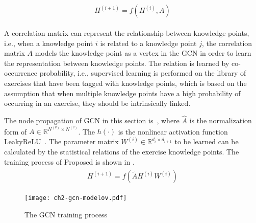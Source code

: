 \begin{align}
    \begin{split}
        H^{(i+1)}=f(H^{(i)},A) \label{fml:ch2-gcnlayer}
    \end{split}
\end{align}


A correlation matrix can represent the relationship between knowledge points, i.e., when a knowledge point \(i\) is related to a knowledge point \(j\), the correlation matrix \(A\) models the knowledge point as a vertex in the GCN in order to learn the representation between knowledge points. The relation is learned by co-occurrence probability, i.e., supervised learning is performed on the library of exercises that have been tagged with knowledge points, which is based on the assumption that when multiple knowledge points have a high probability of occurring in an exercise, they should be intrinsically linked.


The node propagation of GCN in this section is~\eqname{\ref{fml:ch2-gcn2}}, where \(\widehat{A}\) is the normalization form of \(A\in \mathbb{R}^{N^{(v)}\times N^{(v)}}\). The \(h(\cdot)\) is the nonlinear activation function LeakyReLU~\cite{maas2013rectifier}. The parameter matrix \(W^{(i)}\in \mathbb{R}^{d_{i}\times d_{i+1}}\) to be learned can be calculated by the statistical relations of the exercise knowledge points. The training process of Proposed is shown in \figname{\ref{fig:ch2-gcn-explain}}.
\begin{align}
    \begin{split}
        H^{(i+1)} = f(\tilde{A}H^{(i)}W^{(i)})\label{fml:ch2-gcn2}
    \end{split}
\end{align}

\begin{figure}[htbp!]
    \centering
    \texttt{[image: ch2-gcn-modelov.pdf]}
    \caption{The GCN training process}\label{fig:ch2-gcn-explain}
\end{figure}

